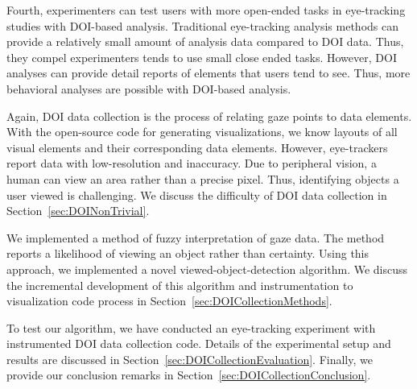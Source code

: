 Fourth, experimenters can test users with more open-ended tasks in eye-tracking studies with DOI-based analysis. Traditional eye-tracking analysis methods can provide a relatively small amount of analysis data compared to DOI data. Thus, they compel experimenters tends to use small close ended tasks. However, DOI analyses can provide detail reports of elements that users tend to see. Thus, more behavioral analyses are possible with DOI-based analysis. 

Again, DOI data collection is the process of relating gaze points to data elements. With the open-source code for generating visualizations, we know layouts of all visual elements and their corresponding data elements. However, eye-trackers report data with low-resolution and inaccuracy. Due to peripheral vision, a human can view an area rather than a precise pixel. Thus, identifying objects a user viewed is challenging. We discuss the difficulty of DOI data collection in Section~\ref{sec:DOINonTrivial}. 

We implemented a method of fuzzy interpretation of gaze data. The method reports a likelihood of viewing an object rather than certainty. Using this approach, we implemented a novel viewed-object-detection algorithm. We discuss the incremental development of this algorithm and instrumentation to visualization code process in Section~\ref{sec:DOICollectionMethods}. 

To test our algorithm, we have conducted an eye-tracking experiment with instrumented DOI data collection code. Details of the experimental setup and results are discussed in Section~\ref{sec:DOICollectionEvaluation}. Finally, we provide our conclusion remarks in Section~\ref{sec:DOICollectionConclusion}.